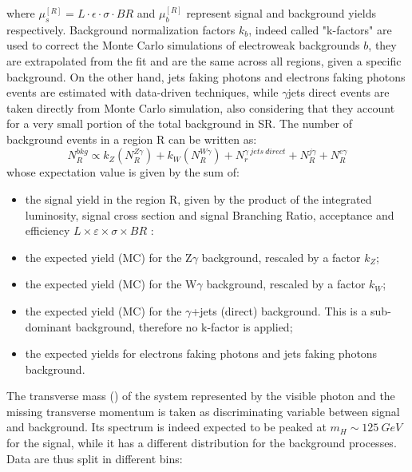 where $\mu_s^{[R]}=L\cdot\epsilon\cdot\sigma\cdot BR$ and $\mu_b^{[R]}$ represent signal and background yields 
respectively. Background normalization factors $k_b$, indeed called "k-factors" are used to correct the Monte Carlo simulations of electroweak backgrounds $b$, they are extrapolated from the fit and are the same across all regions, given a specific background. On the other hand, jets faking photons and electrons faking photons events are estimated with data-driven techniques, while $\gamma$jets direct events are taken directly from Monte Carlo simulation, also considering that they account for a very small portion of the total background in SR. The number of background events in a region R can be written as:
\begin{equation}
    N_R^{bkg} \propto k_Z (N^{Z\gamma}_R) + k_W (N^{W\gamma}_R) + N^{\gamma \: jets \:direct}_r + N_R^{j\gamma} + N_R^{e\gamma} 
\end{equation}
whose expectation value is given by the sum of:
\begin{itemize}
    \item the signal yield in the region R, given by the product of the integrated luminosity, signal cross section and signal Branching Ratio,
    acceptance and efficiency $L \times \varepsilon \times \sigma  \times BR$ :
    \item the expected yield (MC) for the Z$\gamma$ background, rescaled by a factor $k_Z$; 
    \item the expected yield (MC) for the W$\gamma$ background, rescaled by a factor $k_W$; 
    \item the expected yield (MC) for the $\gamma$+jets (direct) background. This is a sub-dominant background, therefore no k-factor is applied; 
    \item the expected yields for electrons faking photons and jets faking photons background. 
\end{itemize}
The transverse mass (\mT) of the system represented by the visible photon and the missing transverse momentum is taken as discriminating variable between signal and background. Its spectrum is indeed expected to be peaked at $m_H\sim\SI{125}{GeV}$ for the signal, while it has a different distribution for the background processes. Data are thus split in different \mT bins:


